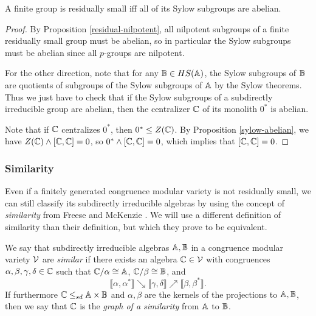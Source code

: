 \documentclass[letterpaper,11pt]{article}
\begin{document}
\begin{cor} A finite group is residually small iff all of its Sylow subgroups are abelian.
\end{cor}
\begin{proof} By Proposition \ref{residual-nilpotent}, all nilpotent subgroups of a finite residually small group must be abelian, so in particular the Sylow subgroups must be abelian since all $p$-groups are nilpotent.

For the other direction, note that for any $\mathbb{B} \in HS(\mathbb{A})$, the Sylow subgroups of $\mathbb{B}$ are quotients of subgroups of the Sylow subgroups of $\mathbb{A}$ by the Sylow theorems. Thus we just have to check that if the Sylow subgroups of a subdirectly irreducible group are abelian, then the centralizer $\mathbb{C}$ of its  monolith $0^*$ is abelian.

Note that if $\mathbb{C}$ centralizes $0^*$, then $0^* \le Z(\mathbb{C})$. By Proposition \ref{sylow-abelian}, we have $Z(\mathbb{C}) \wedge [\mathbb{C},\mathbb{C}] = 0$, so $0^* \wedge [\mathbb{C},\mathbb{C}] = 0$, which implies that $[\mathbb{C},\mathbb{C}] = 0$.
\end{proof}

\subsubsection{Similarity}\label{ss-similarity}

Even if a finitely generated congruence modular variety is not residually small, we can still classify its subdirectly irreducible algebras by using the concept of \emph{similarity} from Freese and McKenzie \cite{commutator-theory}. We will use a different definition of similarity than their definition, but which they prove to be equivalent.

\begin{defn} We say that subdirectly irreducible algebras $\mathbb{A}, \mathbb{B}$ in a congruence modular variety $\mathcal{V}$ are \emph{similar} if there exists an algebra $\mathbb{C} \in \mathcal{V}$ with congruences $\alpha, \beta, \gamma, \delta \in \mathbb{C}$ such that $\mathbb{C}/\alpha \cong \mathbb{A}$, $\mathbb{C}/\beta \cong \mathbb{B}$, and
\[
\llbracket \alpha, \alpha^* \rrbracket \searrow \llbracket \gamma, \delta \rrbracket \nearrow \llbracket \beta, \beta^* \rrbracket.
\]
If furthermore $\mathbb{C} \le_{sd} \mathbb{A}\times \mathbb{B}$ and $\alpha, \beta$ are the kernels of the projections to $\mathbb{A},\mathbb{B}$, then we say that $\mathbb{C}$ is the \emph{graph of a similarity} from $\mathbb{A}$ to $\mathbb{B}$.
\end{defn}
\end{document}
